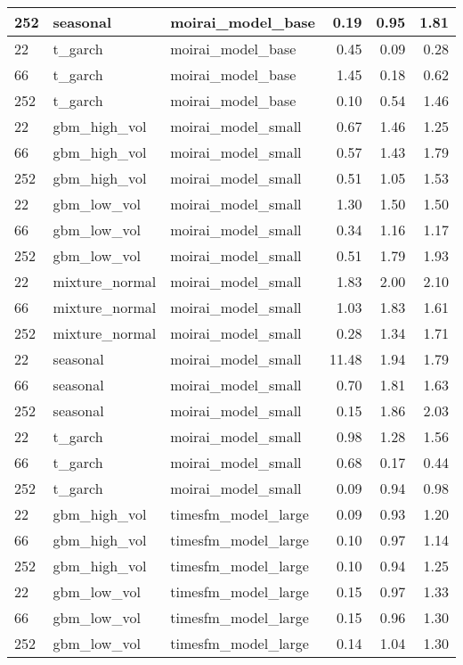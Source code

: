 {\begin{tabular}{lllrrr}
252 & seasonal & moirai\_model\_base & 0.19 & 0.95 & 1.81 \\
\midrule
22 & t\_garch & moirai\_model\_base & 0.45 & 0.09 & 0.28 \\
66 & t\_garch & moirai\_model\_base & 1.45 & 0.18 & 0.62 \\
252 & t\_garch & moirai\_model\_base & 0.10 & 0.54 & 1.46 \\
\midrule
22 & gbm\_high\_vol & moirai\_model\_small & 0.67 & 1.46 & 1.25 \\
66 & gbm\_high\_vol & moirai\_model\_small & 0.57 & 1.43 & 1.79 \\
252 & gbm\_high\_vol & moirai\_model\_small & 0.51 & 1.05 & 1.53 \\
\midrule
22 & gbm\_low\_vol & moirai\_model\_small & 1.30 & 1.50 & 1.50 \\
66 & gbm\_low\_vol & moirai\_model\_small & 0.34 & 1.16 & 1.17 \\
252 & gbm\_low\_vol & moirai\_model\_small & 0.51 & 1.79 & 1.93 \\
\midrule
22 & mixture\_normal & moirai\_model\_small & 1.83 & 2.00 & 2.10 \\
66 & mixture\_normal & moirai\_model\_small & 1.03 & 1.83 & 1.61 \\
252 & mixture\_normal & moirai\_model\_small & 0.28 & 1.34 & 1.71 \\
\midrule
22 & seasonal & moirai\_model\_small & 11.48 & 1.94 & 1.79 \\
66 & seasonal & moirai\_model\_small & 0.70 & 1.81 & 1.63 \\
252 & seasonal & moirai\_model\_small & 0.15 & 1.86 & 2.03 \\
\midrule
22 & t\_garch & moirai\_model\_small & 0.98 & 1.28 & 1.56 \\
66 & t\_garch & moirai\_model\_small & 0.68 & 0.17 & 0.44 \\
252 & t\_garch & moirai\_model\_small & 0.09 & 0.94 & 0.98 \\
\midrule
22 & gbm\_high\_vol & timesfm\_model\_large & 0.09 & 0.93 & 1.20 \\
66 & gbm\_high\_vol & timesfm\_model\_large & 0.10 & 0.97 & 1.14 \\
252 & gbm\_high\_vol & timesfm\_model\_large & 0.10 & 0.94 & 1.25 \\
\midrule
22 & gbm\_low\_vol & timesfm\_model\_large & 0.15 & 0.97 & 1.33 \\
66 & gbm\_low\_vol & timesfm\_model\_large & 0.15 & 0.96 & 1.30 \\
252 & gbm\_low\_vol & timesfm\_model\_large & 0.14 & 1.04 & 1.30 \\

\end{tabular}}
